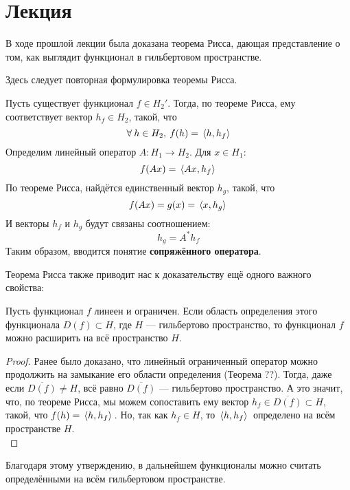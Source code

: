 \documentclass[12pt]{article}
\begin{document}
	\section{Лекция}
	
	В ходе прошлой лекции была доказана теорема Рисса, дающая представление о том, как выглядит функционал в гильбертовом пространстве.
	
	{\color{gray}
		Здесь следует повторная формулировка теоремы Рисса.
	}
	
	Пусть существует функционал $f \in H_2'$. Тогда, по теореме Рисса, ему соответствует вектор $h_f \in H_2$, такой, что 
	$$\forall h \in H_2, \: f(h) = \scal{h}{h_f}$$
	Определим линейный оператор $A : H_1 \rightarrow H_2$. Для $x \in H_1$: 
	$$f(Ax) = \, \langle Ax, h_f \rangle \,$$
	По теореме Рисса, найдётся единственный вектор $h_g$, такой, что 
	$$f(Ax) = g(x) = \, \langle x, h_g \rangle \,$$
	И векторы $h_f$ и $h_g$ будут связаны соотношением:
	$$h_g = A^{*}h_f$$
	Таким образом, вводится понятие \textbf{сопряжённого оператора}.

	Теорема Рисса также приводит нас к доказательству ещё одного важного свойства:
	\begin{state}
		Пусть функционал $f$ линеен и ограничен. Если область определения этого функционала $D(f) \subset H$, 
		где $H$ --- гильбертово пространство, то функционал $f$ можно расширить на всё пространство $H$.
	\end{state}
	\begin{proof}
		Ранее было доказано, что линейный ограниченный оператор можно продолжить на замыкание его области определения 
		(Теорема ??). Тогда, даже если $\overline{D(f)} \neq H$, всё равно $\overline{D(f)}$ --- гильбертово пространство.
		А это значит, что, по теореме Рисса, мы можем сопоставить ему вектор $h_f \in \overline{D(f)} \subset H$, такой, что 
		$f(h) = \, \langle h, h_f \rangle \,$. Но, так как $h_f \in H$, то $\, \langle h, h_f \rangle \,$ определено на всём пространстве $H$. \\
	\end{proof}
	
	Благодаря этому утверждению, в дальнейшем функционалы можно считать определёнными на всём гильбертовом пространстве.
	
\end{document}
